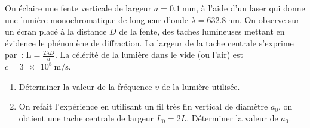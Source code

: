 On éclaire une fente verticale de largeur $a=\qty{0.1}{\mm}$, à l'aide d'un
laser qui donne une lumière monochromatique de longueur d'onde
$\lambda=\qty{632.8}{\nm}$. On observe sur un écran placé à la distance $D$ de
la fente, des taches lumineuses mettant en évidence le phénomène de diffraction.
La largeur de la tache centrale s'exprime par~: $\mathrm{L}=\frac{2\lambda
D}{a}$. La célérité de la lumière dans le vide (ou l'air) est
$c=\qty{3e8}{\m\per\s}$.

\begin{enumerate}
    \item Déterminer la valeur de la fréquence $v$ de la lumière utilisée.
    \item On refait l'expérience en utilisant un fil très fin vertical de
          diamètre $a_{0}$, on obtient une tache centrale de largeur $L_{0}=2L$.
          Déterminer la valeur de $a_{0}$.
\end{enumerate}

